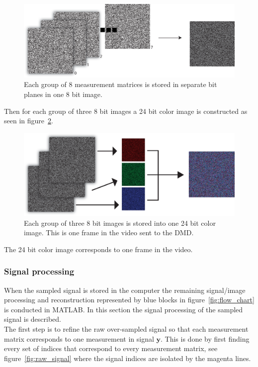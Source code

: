\begin{figure}[H]
\includegraphics[width = 1\linewidth]{gfx/DMD_12.eps}
\caption{Each group of 8 measurement matrices is stored in separate  bit planes in one 8 bit image.}
	\label{fig:8_to_1_8}
\end{figure}

Then for each group of three 8 bit images a 24 bit color image is constructed as seen in figure~\ref{fig:3_8_to_1_3}. 

\begin{figure}[H]
\includegraphics[width = 1\linewidth]{gfx/DMD_2.eps}
\caption{Each group of three 8 bit images is stored into one 24 bit color image. This is one frame in the video sent to the DMD.}
	\label{fig:3_8_to_1_3}
\end{figure}

The 24 bit color image corresponds to one frame in the video.



\subsubsection{Signal processing}
\label{sec:signal_process}  
When the sampled signal is stored in the computer the remaining signal/image processing and reconstruction represented by blue blocks in figure~\ref{fig:flow_chart} is conducted in MATLAB. In this section the signal processing of the sampled signal is described.\\[0.1in]

The first step is to refine the raw over-sampled signal so that each measurement matrix corresponds to one measurement in signal $\mathbf{y}$. This is done by first finding every set of indices that correspond to every measurement matrix, see figure~\ref{fig:raw_signal} where the signal indices are isolated by the magenta lines.


